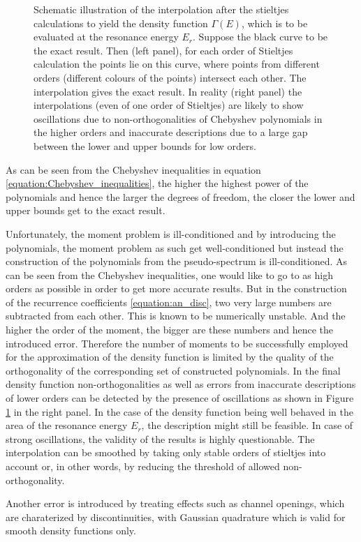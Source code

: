 \begin{figure}[h]
  \centering
  
  \caption{Schematic illustration of the interpolation after the
           stieltjes calculations to yield the density function $\Gamma(E)$,
           which is to be evaluated at the resonance energy $E_r$.
           Suppose the black curve to be the
           exact result. Then (left panel), for each order of Stieltjes calculation
           the points lie on this curve, where points from different orders
           (different colours of the points) intersect each other. The interpolation
           gives the exact result. In reality (right panel) the
           interpolations (even of one order of Stieltjes)
           are likely to show oscillations due to non-orthogonalities of
           Chebyshev polynomials in the higher orders and inaccurate descriptions
           due to a large gap between the lower and upper bounds for low
           orders.}
  \label{figure:stieltjes_density}
\end{figure}

As can be seen from the Chebyshev inequalities in
equation \ref{equation:Chebyshev_inequalities}, the higher the highest
power of the polynomials and hence the larger the degrees of freedom,
the closer the lower and upper bounds get to the exact result.

Unfortunately, the moment problem is ill-conditioned and by introducing
the polynomials, the moment problem as such get well-conditioned but instead
the construction of the polynomials from the pseudo-spectrum is ill-conditioned.
As can be seen from the Chebyshev inequalities, one would like to go to as
high orders as possible in order to get more accurate results. But in the construction
of the recurrence coefficients \ref{equation:an_disc}, two very large numbers
are subtracted from each other. This is known to be numerically unstable.
And the higher the order of the moment, the bigger
are these numbers and hence the introduced error. Therefore the number
of moments to be successfully employed for the approximation of the
density function is limited by the quality of the orthogonality of
the corresponding set of constructed polynomials. In the final density function
non-orthogonalities as well as errors from inaccurate descriptions of lower
orders can be detected by the presence of oscillations as shown in
Figure \ref{figure:stieltjes_density} in the right panel. In the case of the density
function being well behaved in the area of the resonance energy $E_r$, the
description might still be feasible. In case of strong oscillations, the validity
of the results is highly questionable. The interpolation can be smoothed
by taking only stable orders of stieltjes into account or, in other words,
by reducing the threshold of allowed non-orthogonality.

Another error is introduced by treating effects such as channel openings, which
are charaterized by discontinuities, with Gaussian quadrature which is valid
for smooth density functions only. 
